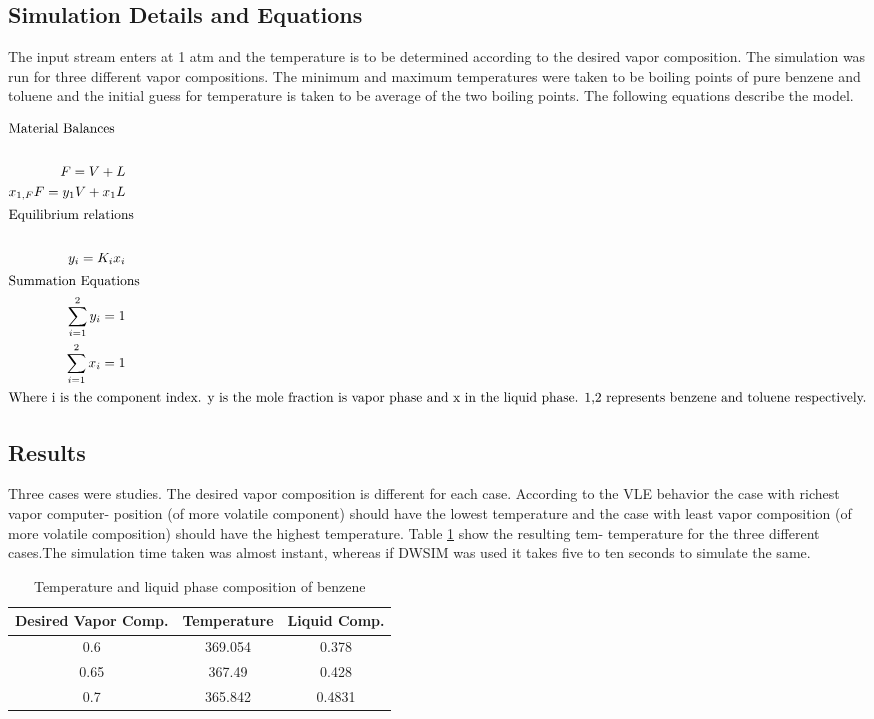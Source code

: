 \documentclass[12pt]{report}
\begin{document}
\subsection{Simulation Details and Equations}
The input stream enters at 1 atm and the temperature is to be determined according to the desired vapor composition. The simulation was run for three different vapor compositions. The minimum and maximum temperatures were taken to be boiling points of pure benzene and toluene and the initial guess for temperature is taken to be average of the two boiling points. The following equations describe the model.

\begin{align*}
\intertext{Material Balances} \\
F=V+L \\
x_{1,F}F = y_1V + x_1L \\
\intertext{Equilibrium relations} \\
y_i = K_ix_i \\
\intertext{Summation Equations}
\sum_{i=1}^{2}y_i = 1 \\
\sum_{i=1}^{2}x_i = 1 \\
\intertext{Where i is the component index. y is the mole fraction is vapor phase and x in the liquid phase. 1,2 represents benzene and toluene respectively.}
\end{align*}

\subsection{Results}
Three cases were studies. The desired vapor composition is different for each case. According to the VLE behavior the case with richest vapor computer- position (of more volatile component) should have the lowest temperature and the case with least vapor composition (of more volatile composition) should have the highest temperature. Table \ref{Tab:Flash} show the resulting tem- temperature for the three different cases.The simulation time taken was almost instant, whereas if DWSIM was used it takes five to ten seconds to simulate the same.

\begin{table}
\centering
\caption{Temperature and liquid phase composition of benzene}
\vspace{1ex}
\label{Tab:Flash}
\begin{tabular}{|c|c|c|} \hline
Desired Vapor Comp. & Temperature & Liquid Comp. \\ \hline
0.6 & 369.054 & 0.378 \\
0.65 & 367.49 & 0.428 \\
0.7 & 365.842 & 0.4831 \\ \hline
\end{tabular}
\end{table}
\end{document}
